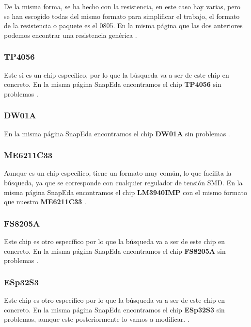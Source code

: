 De la misma forma, se ha hecho con la resistencia, en este caso hay varias, pero se han escogido todas del mismo formato para simplificar el trabajo, el formato de la resistencia o paquete es el 0805. En la misma página que las dos anteriores podemos encontrar una resistencia genérica \cite{SnapedaRes}.

\subsubsection{TP4056}

Este si es un chip específico, por lo que la búsqueda va a ser de este chip en concreto. En la misma página SnapEda \cite{Snapeda} encontramos el chip \textbf{TP4056} sin problemas \cite{SnapedaTP4056}.

\subsubsection{DW01A}

En la misma página SnapEda \cite{Snapeda} encontramos el chip \textbf{DW01A} sin problemas \cite{SnapedaDW01A}.

\subsubsection{ME6211C33}

Aunque es un chip específico, tiene un formato muy común, lo que facilita la búsqueda, ya que se corresponde con cualquier regulador de tensión \gls{SMD}. En la misma página SnapEda \cite{Snapeda} encontramos el chip \textbf{LM3940IMP} con el mismo formato que nuestro \textbf{ME6211C33} \cite{SnapedaME6211C33}.

\subsubsection{FS8205A}

Este chip es otro específico por lo que la búsqueda va a ser de este chip en concreto. En la misma página SnapEda \cite{Snapeda} encontramos el chip \textbf{FS8205A} sin problemas \cite{SnapedaFS8205A}.

\subsubsection{ESp32S3} \label{ESp32S3BusquedaComponente}

Este chip es otro específico por lo que la búsqueda va a ser de este chip en concreto. En la misma página SnapEda \cite{Snapeda} encontramos el chip \textbf{ESp32S3} sin problemas, aunque este posteriormente lo vamos a modificar. \cite{SnapedaESp32S3}.

